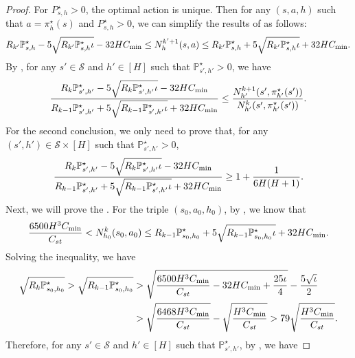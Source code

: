 \documentclass{article}
\begin{document}
\begin{proof}
For $P_{s,h}^{\star} > 0$, the optimal action is unique. Then for any $(s,a,h)$ such that $a = \pi^{\star}_h(s)$ and $P_{s,h}^{\star} > 0$, we can simplify the results of  as follows:
\begin{align}
    \label{optimalvisitN}
    R_{k'}\mathbb{P}_{s,h}^{\star} - 5\sqrt{R_{k'}\mathbb{P}_{s,h}^{\star}\iota} - 32HC_{\textnormal{min}} \leq N_h^{k'+1}(s,a) \leq R_{k'}\mathbb{P}_{s,h}^{\star} + 5\sqrt{R_{k'}\mathbb{P}_{s,h}^{\star}\iota} + 32HC_{\textnormal{min}}.
\end{align}
By , for any $s' \in \mathcal{S}$ and $h' \in [H]$ such that $\mathbb{P}_{s',h'}^{\star} > 0$, we have
\begin{equation*}
    \frac{R_{k}\mathbb{P}_{s',h'}^{\star} - 5\sqrt{R_{k}\mathbb{P}_{s',h'}^{\star}\iota} - 32HC_{\textnormal{min}}}{R_{k-1}\mathbb{P}_{s',h'}^{\star} + 5\sqrt{R_{k-1}\mathbb{P}_{s',h'}^{\star}\iota} + 32HC_{\textnormal{min}}} \leq \frac{N_{h'}^{k+1}(s',\pi_{h'}^{\star}(s'))}{N_{h'}^{k}(s',\pi_{h'}^{\star}(s'))}.
\end{equation*}
For the second conclusion, we only need to prove that,  for any $(s',h') \in \mathcal{S}\times [H]$ such that $\mathbb{P}_{s',h'}^{\star} > 0$,
\begin{equation}
\label{middlegoal}
    \frac{R_{k}\mathbb{P}_{s',h'}^{\star} - 5\sqrt{R_{k}\mathbb{P}_{s',h'}^{\star}\iota} - 32HC_{\textnormal{min}}}{R_{k-1}\mathbb{P}_{s',h'}^{\star} + 5\sqrt{R_{k-1}\mathbb{P}_{s',h'}^{\star}\iota} + 32HC_{\textnormal{min}}} \geq 1 + \frac{1}{6H(H+1)}.
\end{equation}
Next, we will prove the . For the triple $(s_0,a_0,h_0)$, by , we know that
$$\frac{6500H^3C_{\textnormal{min}}}{C_{st}}  < N_{h_0}^k(s_0,a_0) \leq R_{k-1}\mathbb{P}_{s_0,h_0}^{\star} + 5\sqrt{R_{k-1}\mathbb{P}_{s_0,h_0}^{\star}\iota} + 32HC_{\textnormal{min}} .$$
Solving the inequality, we have
\begin{align}
\label{k-1s}
    \sqrt{R_{k}\mathbb{P}_{s_0,h_0}^{\star}}>\sqrt{R_{k-1}\mathbb{P}_{s_0,h_0}^{\star}} &> \sqrt{\frac{6500H^3C_{\textnormal{min}}}{C_{st}}-32HC_{\textnormal{min}} + \frac{25\iota}{4}} - \frac{5\sqrt{\iota}}{2}\nonumber\\
    &> \sqrt{\frac{6468H^3C_{\textnormal{min}}}{C_{st}}} - \sqrt{\frac{H^3C_{\textnormal{min}}}{C_{st}}}  > 79\sqrt{\frac{H^3C_{\textnormal{min}}}{C_{st}}}.
\end{align}
Therefore, for any $s' \in \mathcal{S}$ and $h' \in [H]$ such that $\mathbb{P}_{s',h'}^{\star}$, by , we have

\end{proof}
\end{document}
